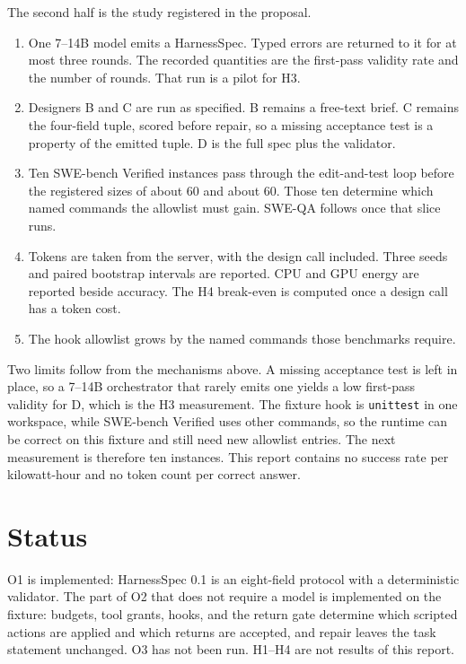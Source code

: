 \documentclass[10pt,a4paper]{article}
\begin{document}
The second half is the study registered in the proposal.
\begin{enumerate}
\item One 7--14B model emits a HarnessSpec. Typed errors are returned to it for at most three rounds. The recorded quantities are the first-pass validity rate and the number of rounds. That run is a pilot for H3.
\item Designers B and C are run as specified. B remains a free-text brief. C remains the four-field tuple, scored before repair, so a missing acceptance test is a property of the emitted tuple. D is the full spec plus the validator.
\item Ten SWE-bench Verified instances pass through the edit-and-test loop before the registered sizes of about 60 and about 60. Those ten determine which named commands the allowlist must gain. SWE-QA follows once that slice runs.
\item Tokens are taken from the server, with the design call included. Three seeds and paired bootstrap intervals are reported. CPU and GPU energy are reported beside accuracy. The H4 break-even is computed once a design call has a token cost.
\item The hook allowlist grows by the named commands those benchmarks require.
\end{enumerate}

Two limits follow from the mechanisms above. A missing acceptance test is left in place, so a 7--14B orchestrator that rarely emits one yields a low first-pass validity for D, which is the H3 measurement. The fixture hook is \texttt{unittest} in one workspace, while SWE-bench Verified uses other commands, so the runtime can be correct on this fixture and still need new allowlist entries. The next measurement is therefore ten instances. This report contains no success rate per kilowatt-hour and no token count per correct answer.

\section{Status}

O1 is implemented: HarnessSpec 0.1 is an eight-field protocol with a deterministic validator. The part of O2 that does not require a model is implemented on the fixture: budgets, tool grants, hooks, and the return gate determine which scripted actions are applied and which returns are accepted, and repair leaves the task statement unchanged. O3 has not been run. H1--H4 are not results of this report.
\end{document}
